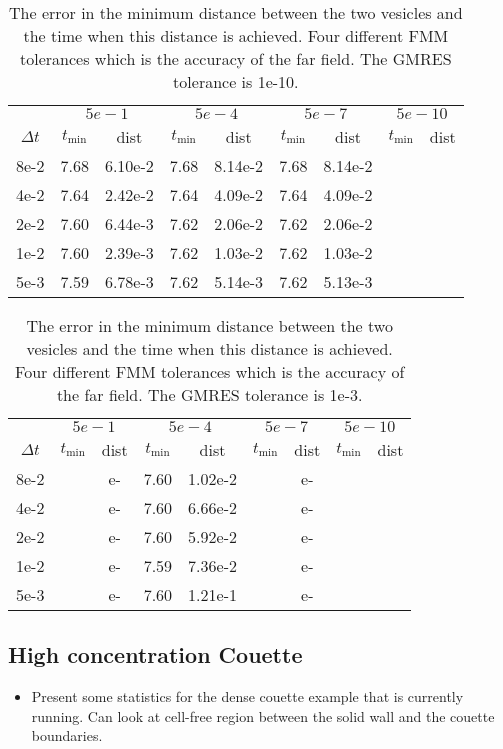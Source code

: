 \begin{table}
\centering
\begin{tabular}{c|cc|cc|cc|cc}
& \multicolumn{2}{c|}{$5e-1$} & \multicolumn{2}{c|}{$5e-4$} &
\multicolumn{2}{c|}{$5e-7$} & \multicolumn{2}{c}{$5e-10$} \\ 
$\Delta t$ & $t_{\min}$ & dist & $t_{\min}$ & dist & $t_{\min}$ & dist
& $t_{\min}$ & dist \\
\hline
8e-2 & 7.68 & 6.10e-2 & 7.68 & 8.14e-2 & 7.68 & 8.14e-2 \\
4e-2 & 7.64 & 2.42e-2 & 7.64 & 4.09e-2 & 7.64 & 4.09e-2 \\
2e-2 & 7.60 & 6.44e-3 & 7.62 & 2.06e-2 & 7.62 & 2.06e-2 \\
1e-2 & 7.60 & 2.39e-3 & 7.62 & 1.03e-2 & 7.62 & 1.03e-2 \\
5e-3 & 7.59 & 6.78e-3 & 7.62 & 5.14e-3 & 7.62 & 5.13e-3
\end{tabular}
\caption{\label{t:FMMerror} The error in the minimum distance between
the two vesicles and the time when this distance is achieved.  Four
different FMM tolerances which is the accuracy of the far field.  The
GMRES tolerance is 1e-10.}
\end{table}


\begin{table}
\centering
\begin{tabular}{c|cc|cc|cc|cc}
& \multicolumn{2}{c|}{$5e-1$} & \multicolumn{2}{c|}{$5e-4$} &
\multicolumn{2}{c|}{$5e-7$} & \multicolumn{2}{c}{$5e-10$} \\ 
$\Delta t$ & $t_{\min}$ & dist & $t_{\min}$ & dist & $t_{\min}$ & dist
& $t_{\min}$ & dist \\
\hline
8e-2 &  & e- & 7.60 & 1.02e-2 &  & e- \\
4e-2 &  & e- & 7.60 & 6.66e-2 &  & e- \\
2e-2 &  & e- & 7.60 & 5.92e-2 &  & e- \\
1e-2 &  & e- & 7.59 & 7.36e-2 &  & e- \\
5e-3 &  & e- & 7.60 & 1.21e-1 &  & e-
\end{tabular}
\caption{\label{t:FMMerror} The error in the minimum distance between
the two vesicles and the time when this distance is achieved.  Four
different FMM tolerances which is the accuracy of the far field.  The
GMRES tolerance is 1e-3.}
\end{table}




\subsection{High concentration Couette}
\begin{itemize}
  \item Present some statistics for the dense couette example that is
  currently running.  Can look at cell-free region between the solid
  wall and the couette boundaries.
\end{itemize}
